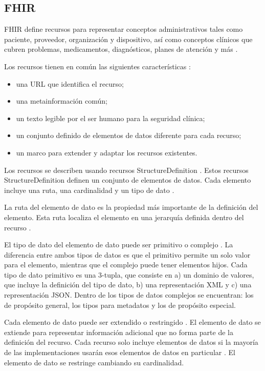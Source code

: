 \subsection{FHIR}

FHIR define recursos para representar conceptos administrativos tales como paciente, proveedor, organización y dispositivo, así como conceptos clínicos que cubren problemas, medicamentos, diagnósticos, planes de atención y más \cite{FHIRResourceList}.

Los recursos tienen en común las siguientes características \cite{FHIRDeveloper}:
\begin{itemize}
  \item una URL que identifica el recurso;
  \item una metainformación común;
  \item un texto legible por el ser humano para la seguridad clínica;
  \item un conjunto definido de elementos de datos diferente para cada recurso;
  \item un marco para extender y adaptar los recursos existentes.
\end{itemize}

Los recursos se describen usando recursos StructureDefinition \cite{FHIRStructureDefinition}. Estos recursos StructureDefinition definen un conjunto de elementos de datos. Cada elemento incluye una ruta, una cardinalidad y un tipo de dato \cite{FHIRElementDefinition}.

La ruta del elemento de dato es la propiedad más importante de la definición del elemento. Esta ruta localiza el elemento en una jerarquía definida dentro del recurso \cite{FHIRElementDefinition}.

El tipo de dato del elemento de dato puede ser primitivo o complejo \cite{FHIRDataTypes}. La diferencia entre ambos tipos de datos es que el primitivo permite un solo valor para el elemento,  mientras que el complejo puede tener elementos hijos. Cada tipo de dato primitivo es una 3-tupla, que consiste en a) un dominio de valores, que incluye la definición del tipo de dato, b) una representación XML y c) una representación JSON. Dentro de los tipos de datos complejos se encuentran: los de propósito general, los tipos para metadatos y los de propósito especial.

Cada elemento de dato puede ser extendido o restringido \cite{FHIRProfiling}. El elemento de dato se extiende para representar información adicional que no forma parte de la definición del recurso\cite{FHIRExtensibility}. Cada recurso solo incluye elementos de datos si la mayoría de las implementaciones usarán esos elementos de datos en particular \cite{FHIRArchitecture}. El elemento de dato se restringe cambiando su cardinalidad.

